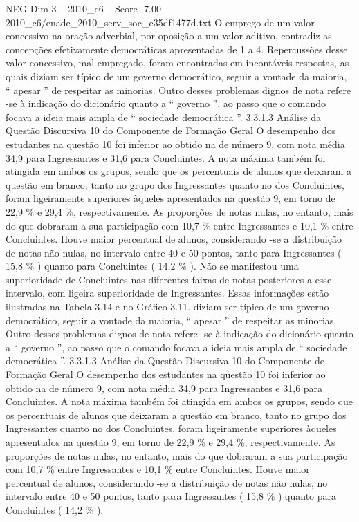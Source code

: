 \begin{textsample}{NEG Dim 3 – 2010\_c6 – Score -7.00 – 2010\_c6/enade\_2010\_serv\_soc\_e35df1477d.txt}
O emprego de um valor concessivo na oração adverbial, por oposição a um valor aditivo, contradiz as concepções efetivamente democráticas apresentadas de 1 a 4.
Repercussões desse valor concessivo, mal empregado, foram encontradas em incontáveis respostas, as quais diziam ser típico de um governo democrático, seguir a vontade da maioria, “ apesar ” de respeitar as minorias.
Outro desses problemas dignos de nota refere -se à indicação do dicionário quanto a “ governo ”, ao passo que o comando focava a ideia mais ampla de “ sociedade democrática ”. 3.3.1.3 Análise da Questão Discursiva 10 do Componente de Formação Geral O desempenho dos estudantes na questão 10 foi inferior ao obtido na de número 9, com nota média 34,9 para Ingressantes e 31,6 para Concluintes.
A nota máxima também foi atingida em ambos os grupos, sendo que os percentuais de alunos que deixaram a questão em branco, tanto no grupo dos Ingressantes quanto no dos Concluintes, foram ligeiramente superiores àqueles apresentados na questão 9, em torno de 22,9 \% e 29,4 \%, respectivamente.
As proporções de notas nulas, no entanto, mais do que dobraram a sua participação com 10,7 \% entre Ingressantes e 10,1 \% entre Concluintes.
Houve maior percentual de alunos, considerando -se a distribuição de notas não nulas, no intervalo entre 40 e 50 pontos, tanto para Ingressantes ( 15,8 \% ) quanto para Concluintes ( 14,2 \% ).
Não se manifestou uma superioridade de Concluintes nas diferentes faixas de notas posteriores a esse intervalo, com ligeira superioridade de Ingressantes.
Essas informações estão ilustradas na Tabela 3.14 e no Gráfico 3.11. diziam ser típico de um governo democrático, seguir a vontade da maioria, “ apesar ” de respeitar as minorias.
Outro desses problemas dignos de nota refere -se à indicação do dicionário quanto a “ governo ”, ao passo que o comando focava a ideia mais ampla de “ sociedade democrática ”. 3.3.1.3 Análise da Questão Discursiva 10 do Componente de Formação Geral O desempenho dos estudantes na questão 10 foi inferior ao obtido na de número 9, com nota média 34,9 para Ingressantes e 31,6 para Concluintes.
A nota máxima também foi atingida em ambos os grupos, sendo que os percentuais de alunos que deixaram a questão em branco, tanto no grupo dos Ingressantes quanto no dos Concluintes, foram ligeiramente superiores àqueles apresentados na questão 9, em torno de 22,9 \% e 29,4 \%, respectivamente.
As proporções de notas nulas, no entanto, mais do que dobraram a sua participação com 10,7 \% entre Ingressantes e 10,1 \% entre Concluintes.
Houve maior percentual de alunos, considerando -se a distribuição de notas não nulas, no intervalo entre 40 e 50 pontos, tanto para Ingressantes ( 15,8 \% ) quanto para Concluintes ( 14,2 \% ).

\end{textsample}
